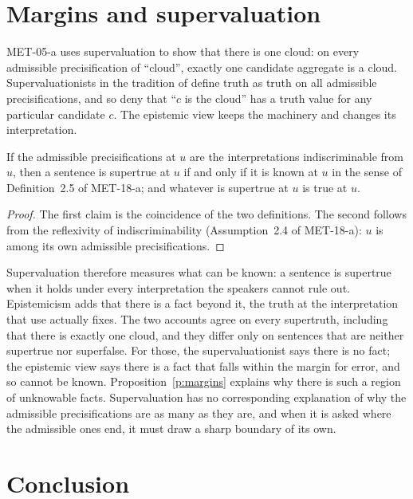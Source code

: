 \documentclass{situationist-preprint}
\begin{document}
\section{Margins and supervaluation}\label{s:super}

MET-05-a uses supervaluation to show that there is one cloud: on every admissible precisification of \enquote{cloud}, exactly one candidate aggregate is a cloud. Supervaluationists in the tradition of \citet{Fine1975} define truth as truth on all admissible precisifications, and so deny that \enquote{$c$ is the cloud} has a truth value for any particular candidate $c$. The epistemic view keeps the machinery and changes its interpretation.

\begin{proposition}\label{p:super}
If the admissible precisifications at $u$ are the interpretations indiscriminable from $u$, then a sentence is supertrue at $u$ if and only if it is known at $u$ in the sense of Definition~2.5 of MET-18-a; and whatever is supertrue at $u$ is true at $u$.
\end{proposition}

\begin{proof}
The first claim is the coincidence of the two definitions. The second follows from the reflexivity of indiscriminability (Assumption~2.4 of MET-18-a): $u$ is among its own admissible precisifications.
\end{proof}

Supervaluation therefore measures what can be known: a sentence is supertrue when it holds under every interpretation the speakers cannot rule out. Epistemicism adds that there is a fact beyond it, the truth at the interpretation that use actually fixes. The two accounts agree on every supertruth, including that there is exactly one cloud, and they differ only on sentences that are neither supertrue nor superfalse. For those, the supervaluationist says there is no fact; the epistemic view says there is a fact that falls within the margin for error, and so cannot be known. Proposition~\ref{p:margins} explains why there is such a region of unknowable facts. Supervaluation has no corresponding explanation of why the admissible precisifications are as many as they are, and when it is asked where the admissible ones end, it must draw a sharp boundary of its own.

\section{Conclusion}
\end{document}
